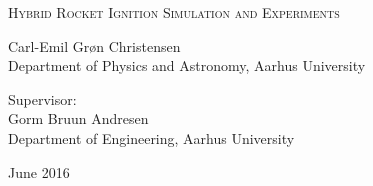 
\begin{titlingpage}

\begin{center}

\vspace*{0cm}
\HUGE
\textsc{Hybrid Rocket Ignition Simulation and Experiments}\\
\vspace{1.5cm}

%
\vspace{1.2cm}

\large
{
    Carl-Emil Grøn Christensen\\
    Department of Physics and Astronomy, Aarhus University
}

\vspace{1.5cm}

{
  Supervisor:\\
  Gorm Bruun Andresen\\
  Department of Engineering, Aarhus University
}

\vspace{1.5cm}
{June 2016}\\


\end{center}



\end{titlingpage}
